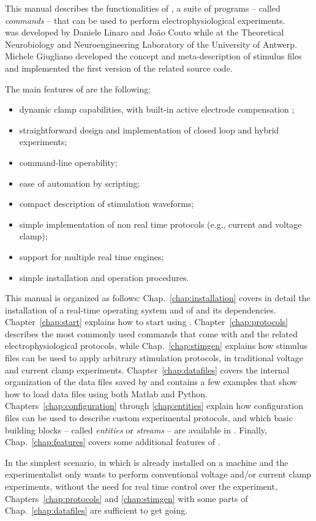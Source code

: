 This manual describes the functionalities of \progname, a suite of
programs -- called {\it commands} -- that can be used to
perform electrophysiological experiments.\\
\progname was developed by Daniele Linaro and Jo\~ao Couto while at
the Theoretical Neurobiology and Neuroengineering Laboratory of the
University of Antwerp. Michele Giugliano developed the concept and
meta-description of stimulus files and implemented the first version
of the related source code.

The main features of \progname are the following:
\begin{itemize}
\item dynamic clamp capabilities, with built-in active electrode
compensation \cite{Brette:2008};
\item straightforward design and implementation of closed loop and
hybrid experiments;
\item command-line operability;
\item ease of automation by scripting;
\item compact description of stimulation waveforms;
\item simple implementation of non real time protocols (e.g., current
  and voltage clamp);
\item support for multiple real time engines;
\item simple installation and operation procedures.
\end{itemize}

This manual is organized as follows: Chap.~\ref{chap:installation}
covers in detail the installation of a real-time operating system and of
\progname and its dependencies. Chapter~\ref{chap:start} explains how
to start using \progname. Chapter~\ref{chap:protocols} describes
the most commonly used commands that come with \progname and the
related electrophysiological protocols, while Chap.~\ref{chap:stimgen} explains how
stimulus files can be used to apply arbitrary stimulation protocols,
in traditional voltage and current clamp
experiments. Chapter~\ref{chap:datafiles} covers the internal
organization of the data files saved by \progname and contains a few
examples that show how to load \progname data files using both Matlab
and Python. Chapters~\ref{chap:configuration} through
\ref{chap:entities} explain how configuration files can be used to
describe custom experimental protocols, and which basic building blocks
-- called {\it entities} or {\it streams} -- are available in \progname.
Finally, Chap.~\ref{chap:features} covers some additional features of
\progname.

In the simplest scenario, in which \progname is already installed on a
machine and the experimentalist only wants to perform conventional
voltage and/or current clamp experiments, without the need for real
time control over the experiment, Chapters~\ref{chap:protocols} and
\ref{chap:stimgen} with some parts of Chap.~\ref{chap:datafiles} are
sufficient to get going.